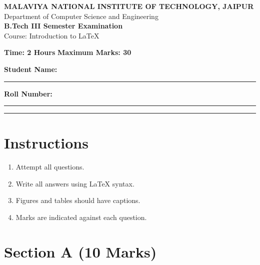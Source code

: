 \documentclass[12pt,a4paper]{article}
\begin{document}
	
	
	\begin{center}
		{\Large \textbf{MALAVIYA NATIONAL INSTITUTE OF TECHNOLOGY, JAIPUR}}\\[0.2cm]
		{\large Department of Computer Science and Engineering}\\[0.3cm]
		{\Large \textbf{B.Tech III Semester Examination}}\\[0.2cm]
		{\large Course: Introduction to LaTeX}\\[0.5cm]
	\end{center}
	
	\noindent
	\textbf{Time: 2 Hours} \hfill \textbf{Maximum Marks: 30}
	
	\vspace{0.5cm}
	
	\noindent
	\textbf{Student Name:} \rule{6cm}{0.4pt}
	
	\vspace{0.3cm}
	
	\noindent
	\textbf{Roll Number:} \rule{5cm}{0.4pt}
	
	\hrule
	\vspace{0.4cm}
	
	
	\section*{Instructions}
	
	\begin{enumerate}
		\item Attempt all questions.
		\item Write all answers using LaTeX syntax.
		\item Figures and tables should have captions.
		\item Marks are indicated against each question.
	\end{enumerate}
	
	
	\section*{Section A (10 Marks)}
	
\end{document}
